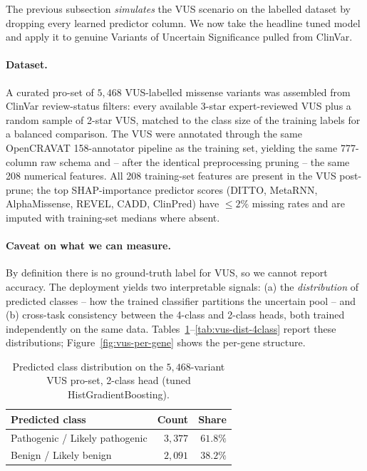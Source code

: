 \documentclass[11pt,a4paper]{article}
\begin{document}
The previous subsection \emph{simulates} the VUS scenario
on the labelled dataset by dropping every learned predictor column. We now
take the headline tuned model and apply it to genuine Variants of Uncertain
Significance pulled from ClinVar.

\paragraph{Dataset.}
A curated pro-set of $5{,}468$ VUS-labelled missense variants was assembled
from ClinVar review-status filters: every available 3-star expert-reviewed
VUS plus a random sample of 2-star VUS, matched to the class size of the
training labels for a balanced comparison.
The VUS were annotated through the same OpenCRAVAT 158-annotator pipeline as
the training set, yielding the same 777-column raw schema and -- after the
identical preprocessing pruning -- the same 208 numerical features. All 208
training-set features are present in the VUS post-prune; the top
SHAP-importance predictor scores (DITTO, MetaRNN, AlphaMissense, REVEL,
CADD, ClinPred) have $\le 2\%$ missing rates and are imputed with
training-set medians where absent.

\paragraph{Caveat on what we can measure.}
By definition there is no ground-truth label for VUS, so we cannot report
accuracy. The deployment yields two interpretable signals: (a) the
\emph{distribution} of predicted classes -- how the trained classifier
partitions the uncertain pool -- and (b) cross-task consistency between
the 4-class and 2-class heads, both trained independently on the same data.
Tables~\ref{tab:vus-dist-2class}--\ref{tab:vus-dist-4class} report these
distributions; Figure~\ref{fig:vus-per-gene} shows the per-gene structure.

\begin{table}[H]
\centering
\caption{Predicted class distribution on the $5{,}468$-variant VUS pro-set,
2-class head (tuned HistGradientBoosting).}
\label{tab:vus-dist-2class}
\small
\begin{tabular}{lrr}
\toprule
Predicted class & Count & Share \\
\midrule
Pathogenic / Likely pathogenic & $3{,}377$ & $61.8\%$ \\
Benign / Likely benign & $2{,}091$ & $38.2\%$ \\
\bottomrule
\end{tabular}
\end{table}
\end{document}
